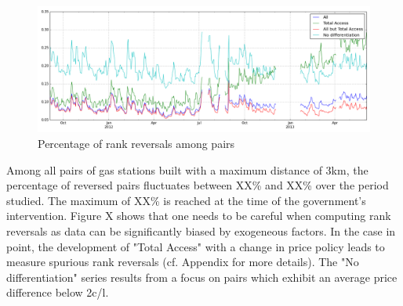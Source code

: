 \documentclass[11pt]{article}
\begin{document}
\begin{figure}[!h]
    \caption{Percentage of rank reversals among pairs}
	\centering
		\includegraphics[width=16cm]{graphs/ecdf_rr_temporal.png}
\end{figure}

Among all pairs of gas stations built with a maximum distance of 3km, the percentage of reversed pairs fluctuates between XX\% and XX\% over the period studied. The maximum of XX\% is reached at the time of the government's intervention. Figure X shows that one needs to be careful when computing rank reversals as data can be significantly biased by exogeneous factors. In the case in point, the development of "Total Access" with a change in price policy leads to measure spurious rank reversals (cf. Appendix for more details). The "No differentiation" series results from a focus on pairs which exhibit an average price difference below 2c/l.
\end{document}
